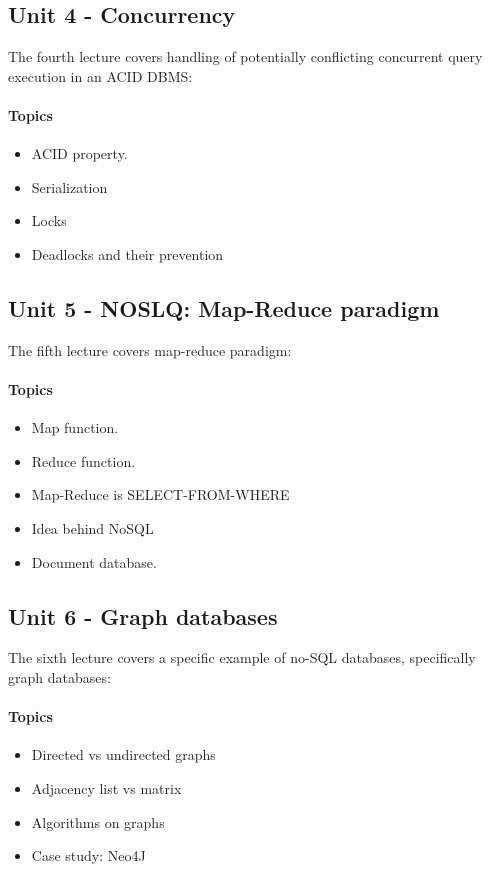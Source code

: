 	\subsection{Unit 4 - Concurrency}
		The fourth lecture covers handling of potentially conflicting concurrent query execution in an ACID DBMS:

		\paragraph*{Topics}
			\begin{itemize}
				\item ACID property.
				\item Serialization
				\item Locks
				\item Deadlocks and their prevention
			\end{itemize}


	\subsection{Unit 5 - NOSLQ: Map-Reduce paradigm}
		The fifth lecture covers map-reduce paradigm:

		\paragraph*{Topics}
			\begin{itemize}
				\item Map function.
				\item Reduce function.
				\item Map-Reduce is SELECT-FROM-WHERE
				\item Idea behind NoSQL
				\item Document database.
			\end{itemize}


	\subsection{Unit 6 - Graph databases}
		The sixth lecture covers a specific example of no-SQL databases, specifically graph databases:

		\paragraph*{Topics}
			\begin{itemize}
				\item Directed vs undirected graphs
				\item Adjacency list vs matrix
				\item Algorithms on graphs
				\item Case study: Neo4J
			\end{itemize}
